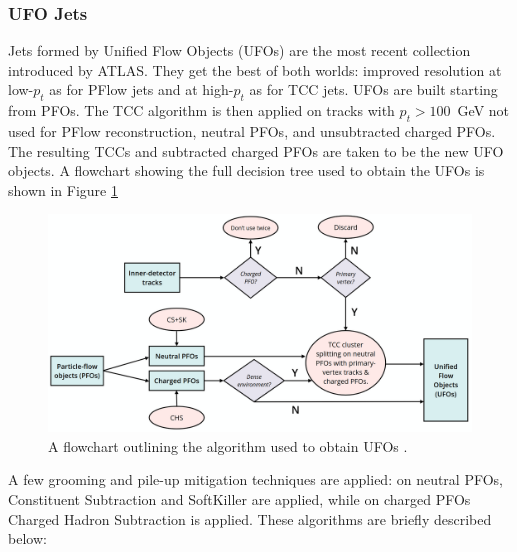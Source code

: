 \documentclass[10pt,a4paper]{book}
\begin{document}
\subsubsection{UFO Jets}
Jets formed by Unified Flow Objects (UFOs) are the most recent collection introduced by ATLAS. They get the best of both worlds: improved resolution at low-$p_t$ as for PFlow jets and at high-$p_t$ as for TCC jets. 
UFOs are built starting from PFOs. The TCC algorithm is then applied on tracks with $p_t > 100$~GeV not used for PFlow reconstruction, neutral PFOs, and unsubtracted charged PFOs. 
The resulting TCCs and subtracted charged PFOs are taken to be the new UFO objects. A flowchart showing the full decision tree used to obtain the UFOs is shown in Figure \ref{fig:ufoFlow}
\begin{figure}
    \centering
    \includegraphics[width=0.85\linewidth]{atlas/ufos.png}
    \caption{A flowchart outlining the algorithm used to obtain UFOs \cite{ATLAS:2020gwe}.}
    \label{fig:ufoFlow}
\end{figure}
A few grooming and pile-up mitigation techniques are applied: on neutral PFOs, Constituent Subtraction and SoftKiller are applied, while on charged PFOs Charged Hadron Subtraction is applied. These algorithms are briefly described below:
\end{document}
